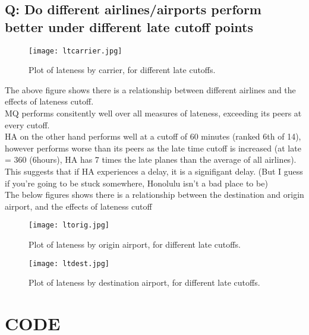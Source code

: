 \documentclass[12pt]{article}
\begin{document}
		\subsection{Q: Do different airlines/airports perform better under different late cutoff points}
		\begin{figure}[h!]
			\centering
			\texttt{[image: ltcarrier.jpg]}
			\caption{Plot of lateness by carrier, for different late cutoffs.}
		\end{figure}
		The above figure shows there is a relationship between different airlines and the effects of lateness cutoff. \\
		MQ performs consitently well over all measures of lateness, exceeding its peers at every cutoff.
		\\HA on the other hand performs well at a cutoff of 60 minutes (ranked 6th of 14), however performs worse than its peers as the late time cutoff is increased (at late = 360 (6hours), HA has 7 times the late planes than the average of all airlines). This suggests that if HA experiences a delay, it is a signifigant delay. (But I guess if you're going to be stuck somewhere, Honolulu isn't a bad place to be)
		\\The below figures shows there is a relationship between the destination and origin airport, and the effects of lateness cutoff		
	\newpage
		\begin{figure}[h!]
			\centering
			\texttt{[image: ltorig.jpg]}
			\caption{Plot of lateness by origin airport, for different late cutoffs.}
			\texttt{[image: ltdest.jpg]}
			\caption{Plot of lateness by destination airport, for different late cutoffs.}
		\end{figure}
	\clearpage
	\section{CODE}
	
\end{document}
